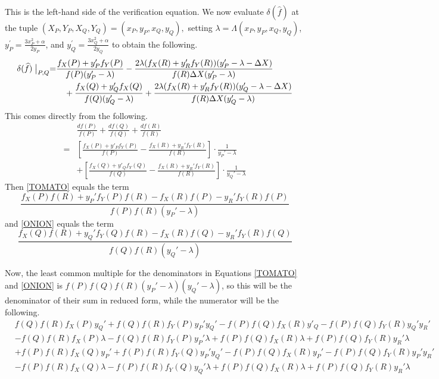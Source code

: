 \documentclass[11pt,letterpaper]{article}
\theoremstyle{definition}
\newcommand{\6}{\mathbf}
\newcommand{\7}{\mathcal}
\begin{document}
This is the left-hand side of the verification equation. We now evaluate $\delta(\widehat{f})$ at the tuple 
$(X_P, Y_P, X_Q, Y_Q) = (x_P, y_P, x_Q, y_Q),$ 
setting $\lambda = \Lambda(x_P,y_P, x_Q, y_Q)$, $y_P^\prime = \frac{3x_P^2+\alpha}{2y_P}$, and  $y_Q^\prime = \frac{3x_Q^2+\alpha}{2y_Q}$ to obtain the following.
\begin{align}
\delta(\widehat{f}) \bigm\vert_{P,Q} =& 
\frac{f_X(P) + y_P^\prime f_Y(P)}{f(P)(y_P^\prime - \lambda)}- 
\frac{2\lambda(f_X(R) + y_R^\prime f_Y(R))(y_P^\prime - \lambda - \Delta X)}{f(R)\Delta X(y_P^\prime - \lambda)} \nonumber  \\
&  \quad + \frac{f_X(Q) + y_Q^\prime f_X(Q)}{f(Q)(y_Q^\prime - \lambda)} + 
\frac{2\lambda(f_X(R) + y_R^\prime f_Y(R))(y_Q^\prime - \lambda - \Delta X)}{f(R) \Delta X(y_Q^\prime - \lambda)} 
\end{align}
This comes directly from the following.
\begin{align}
& \frac{df(P)}{f(P)} + \frac{df(Q)}{f(Q)} + \frac{df(R)}{f(R)} \nonumber \\
=& \left [ \frac{f_X(P) + y'_P f_Y(P)}{f(P)} - \frac{f_X(R)+y_R' f_Y(R)}{f(R)}\right ] \cdot \frac{1}{y_P' - \lambda} \label{TOMATO} \\
& + \left [ \frac{f_X(Q) + y'_Q f_Y(Q)}{f(Q)} - \frac{f_X(R)+y_R' f_Y(R)}{f(R)}\right ] \cdot \frac{1}{y_Q' - \lambda} \label{ONION}
\end{align}
Then \ref{TOMATO} equals the term
$$\frac{f_X(P)f(R) + y_P' f_Y(P) f(R) - f_X(R) f(P) - y_R' f_Y(R)f(P)}{f(P)f(R)(y_P'- \lambda)}$$
and \ref{ONION} equals the term
$$\frac{f_X(Q)f(R) + y_Q' f_Y(Q) f(R) - f_X(R) f(Q) - y_R' f_Y(R)f(Q)}{f(Q)f(R)(y_Q'- \lambda)}$$

Now, the least common multiple for the denominators in Equations \ref{TOMATO} and \ref{ONION} is  $f(P)f(Q)f(R)(y_P' - \lambda)(y_Q' - \lambda)$, so this will be the denominator of their sum in reduced form, while the numerator will be the following.
\begin{align*}
    & f(Q)f(R)f_X(P)y_Q' + f(Q)f(R)f_Y(P)y_P'y_Q' - f(P)f(Q)f_X(R)y'_Q - f(P)f(Q)f_Y(R)y_Q'y_R' \\
    &-f(Q)f(R)f_X(P) \lambda -f(Q)f(R)f_Y(P)y_P' \lambda +f(P)f(Q)f_X(R) \lambda +f(P)f(Q)f_Y(R)y_R' \lambda \\
    &+ f(P)f(R)f_X(Q)y_P' +f(P)f(R)f_Y(Q)y_P'y_Q' - f(P)f(Q)f_X(R)y_P' - f(P)f(Q)f_Y(R)y_P'y_R' \\
    & -f(P)f(R)f_X(Q) \lambda - f(P)f(R)f_Y(Q)y_Q' \lambda + f(P)f(Q)f_X(R) \lambda + f(P)f(Q)f_Y(R)y_R' \lambda
\end{align*}
\end{document}
